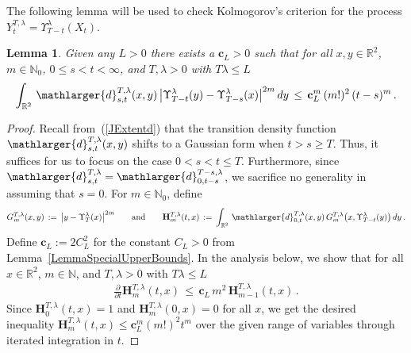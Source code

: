 \documentclass[10pt]{article}
\numberwithin{equation}{section}
\newtheorem{lemma}[theorem]{Lemma}
\theoremstyle{definition}
\newcommand{\R}{{\mathbb R}}
\newcommand{\Rphi}{{\Upsilon}}
\begin{document}
\begin{appendix}
The following lemma will be used to check  Kolmogorov's criterion for the process $Y_t^{T,\lambda}=\Rphi_{T-t}^{\lambda}(X_t)$. 
\begin{lemma}\label{LemmaKOLMOGOROV}  Given any $L>0$ there exists a $\mathbf{c}_L>0$ such that for all  $x,y\in \R^2$, $m\in \mathbb{N}_0$, $0\leq s<t<\infty$, and $T,\lambda>0$ with $T\lambda\leq L$
\begin{align*}
\int_{\R^2} \, \mathlarger{d}_{s,t}^{T,\lambda}(x,y)\,\big| \Rphi_{T-t}^{\lambda} (y) -\Rphi_{T-s}^{\lambda}(x) \big|^{2m}\, dy \,\leq \,  \mathbf{c}_{L}^m \, (m!)^2 \, (t-s)^m  \,. 
\end{align*}

\end{lemma}

\begin{proof}   Recall from~(\ref{JExtentd}) that the transition density function $ \mathlarger{d}_{s,t}^{T,\lambda}(x,y)$ shifts to  a Gaussian form when $t>s\geq T$. Thus, it suffices for us to focus on the  case $0<s<t\leq T$.  Furthermore, since $ \mathlarger{d}_{s,t}^{T,\lambda}= \mathlarger{d}_{0,t-s}^{T-s,\lambda}$, we sacrifice no generality in assuming that $s=0$. For $m\in \mathbb{N}_0$, define
$$G_{m}^{T,\lambda}(x,y)\,:=\,\big| y -\Rphi_{T}^{\lambda}(x) \big|^{2m}\hspace{.7cm}\text{and}\hspace{.7cm} 
 \mathbf{H}_{m}^{T,\lambda}(t,x)\,:=\,\int_{\R^2} \, \mathlarger{d}_{0,t}^{T,\lambda}(x,y)\,G_{m}^{T,\lambda}\big(x,\Rphi_{T-t}^{\lambda}(y) \big)\, dy \,. $$  
 Define $\mathbf{c}_L:=2C_L^2$ for the constant $C_L>0$ from Lemma~\ref{LemmaSpecialUpperBounds}.  In the analysis below, we show that for all  $x\in \R^2$, $m\in \mathbb{N}$, and $T,\lambda>0$ with  $T\lambda\leq L$ 
\begin{align}\label{HSUFFICIENT}
\frac{\partial }{\partial t}\mathbf{H}_{m}^{T,\lambda}(t,x)\,\leq \,\mathbf{c}_L \,m^2\,\mathbf{H}_{m-1}^{T,\lambda}(t,x)\,.  
\end{align}
Since $\mathbf{H}_{0}^{T,\lambda}(t,x)=1$ and $\mathbf{H}_{m}^{T,\lambda}(0,x)=0$ for all $x$, we get the desired inequality $\mathbf{H}_{m}^{T,\lambda}(t,x)\leq \mathbf{c}_L^m (m!)^2 t^m $ over the given range of variables through iterated integration in $t$.



\end{proof}
\end{appendix}
\end{document}
